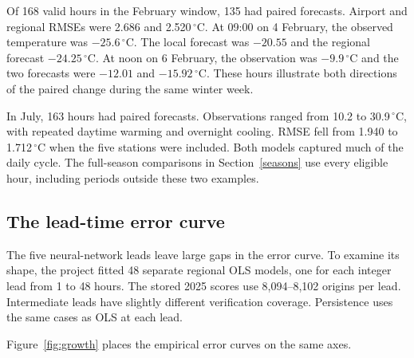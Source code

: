 \documentclass[11pt,letterpaper]{article}
\newcommand{\celsius}{\ensuremath{^{\circ}\mathrm{C}}}\newcommand{\code}[1]{\texttt{\small #1}}
\begin{document}
Of 168 valid hours in the February window, 135 had paired forecasts. Airport and regional RMSEs were 2.686 and 2.520\,\celsius. At 09:00 on 4 February, the observed temperature was $-25.6$\,\celsius. The local forecast was $-20.55$ and the regional forecast $-24.25$\,\celsius. At noon on 6 February, the observation was $-9.9$\,\celsius{} and the two forecasts were $-12.01$ and $-15.92$\,\celsius. These hours illustrate both directions of the paired change during the same winter week.


In July, 163 hours had paired forecasts. Observations ranged from 10.2 to 30.9\,\celsius{}, with repeated daytime warming and overnight cooling. RMSE fell from 1.940 to 1.712\,\celsius{} when the five stations were included. Both models captured much of the daily cycle. The full-season comparisons in Section~\ref{seasons} use every eligible hour, including periods outside these two examples.


\subsection{The lead-time error curve}\label{growth}
The five neural-network leads leave large gaps in the error curve. To examine its shape, the project fitted 48 separate regional OLS models, one for each integer lead from 1 to 48 hours. The stored 2025 scores use 8,094--8,102 origins per lead. Intermediate leads have slightly different verification coverage. Persistence uses the same cases as OLS at each lead.

Figure~\ref{fig:growth} places the empirical error curves on the same axes.
\end{document}
